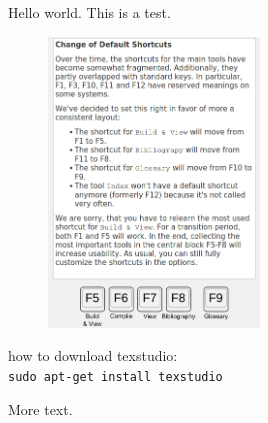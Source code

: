 \documentclass[a4paper,12pt]{article}
\begin{document}
Hello world. This is a test.
\begin{figure}[h]
	\centering
	\includegraphics[width=0.5\textwidth]{shortcut_info.png}
\end{figure}

how to download texstudio: \\
\texttt{sudo apt-get install texstudio}


More text.
\end{document}
